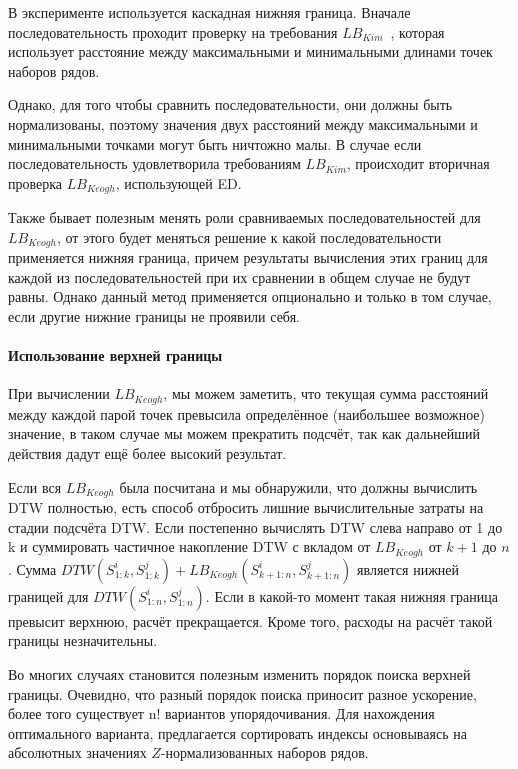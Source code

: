 \documentclass[12pt,twoside]{article}
\begin{document}
        В эксперименте используется каскадная нижняя граница.
        Вначале последовательность проходит проверку на требования $LB_{Kim}$~\cite{lbkim}, которая использует расстояние между максимальными и минимальными длинами точек наборов рядов. 
        
        Однако, для того чтобы сравнить последовательности, они должны быть нормализованы, поэтому значения двух расстояний между максимальными и минимальными точками могут быть ничтожно малы.
        В случае если последовательность удовлетворила требованиям $LB_{Kim}$, происходит вторичная проверка $LB_{Keogh}$, использующей ED.
        
        Также бывает полезным менять роли сравниваемых последовательностей для $LB_{Keogh}$, от этого будет меняться решение к какой последовательности применяется нижняя граница, причем результаты вычисления этих границ для каждой из последовательностей при их сравнении в общем случае не будут равны. Однако данный метод применяется опционально и только в том случае, если другие нижние границы не проявили себя.
        
        \paragraph{Использование верхней границы}
        При вычислении $LB_{Keogh}$, мы можем заметить, что текущая сумма расстояний между каждой парой точек превысила определённое (наибольшее возможное) значение, в таком случае мы можем прекратить подсчёт, так как дальнейший действия дадут ещё более высокий результат.
        
        Если вся $LB_{Keogh}$ была посчитана и мы обнаружили, что должны вычислить DTW полностью, есть способ отбросить лишние вычислительные затраты на стадии подсчёта DTW.
        Если постепенно вычислять DTW слева направо от 1 до k и суммировать частичное накопление DTW с вкладом от $LB_{Keogh}$ от $k + 1$ до $n$. 
        Сумма $DTW(S_{1:k}^i, S_{1:k}^j) + LB_{Keogh}(S_{k+1:n}^i, S_{k+1:n}^j)$ является нижней границей для $DTW(S_{1:n}^i, S_{1:n}^j)$.
        Если в какой-то момент такая нижняя граница превысит верхнюю, расчёт прекращается. Кроме того, расходы на расчёт такой границы незначительны.
        
        Во многих случаях становится полезным изменить порядок поиска верхней границы. Очевидно, что разный порядок поиска приносит разное ускорение, более того существует n! вариантов упорядочивания.
        Для нахождения оптимального варианта, предлагается сортировать индексы основываясь на абсолютных значениях $Z$\--нормализованных наборов рядов.
	
\end{document}
